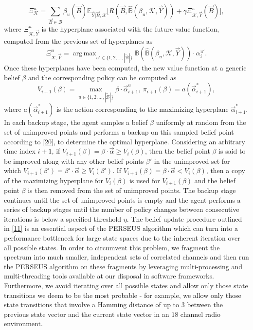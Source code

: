 \documentclass[10pt,twocolumn]{IEEEtran}
\DeclareMathOperator*{\argmax}{arg\,max}
\begin{document}
\begin{equation}
        \Xi_{\mathcal{K}}^{u} = \sum_{\vec{B} {\in} \mathcal{B}} \beta_{u}(\vec{B}) \mathbb{E}_{\vec{Y}|\vec{B}, \mathcal{K}} \Big[R(\vec{B}, \hat{\mathbb{B}}(\beta_{u}, \mathcal{K}, \vec{Y}))+\gamma 
        \Xi_{\mathcal{K}, \vec{Y}}^{u}(\vec{B})\Big],
\nonumber
\end{equation}
where $\Xi_{\mathcal{K}, \vec{Y}}^{u}$ is the hyperplane associated with the future value function, computed from the previous set of hyperplanes as
\begin{equation}
    \Xi_{\mathcal{K}, \vec{Y}}^{u}=\argmax_{u' {\in} \{1, 2, \dots, |\tilde{\mathcal{B}}|\}} \mathbb{B}(\hat{\mathbb{B}}(\beta_{u}, \mathcal{K}, \vec{Y}))\cdot\alpha_{i}^{u'}.
\nonumber
\end{equation}
Once these hyperplanes have been computed, the new value function at a generic belief $\beta$ and the corresponding policy can be computed as
\begin{equation}\label{40}
V_{i+1}(\beta) =\!\!\!\!\!\!\!\!\max_{u {\in} \{1, 2, \dots, |\tilde{\mathcal{B}}|\}}\! \beta \cdot \vec{\alpha}_{i+1}^u,
\ \pi_{i+1}(\beta) = a(\vec{\alpha}_{i+1}^{*}),\!\!
\end{equation}
where $a(\vec{\alpha}_{i+1}^{*})$ is the action corresponding to the maximizing hyperplane $\vec{\alpha}_{i+1}^{*}$. In each backup stage, the agent samples a belief $\beta$ uniformly at random from the set of unimproved points and performs a backup on this sampled belief point according to \eqref{20}, to determine the optimal hyperplane. Considering an arbitrary time index $i{+}1$, if $V_{i+1}(\beta){=}\beta{\cdot}\vec{\alpha}{\geq}V_{i}(\beta)$, then the belief point $\beta$ is said to be improved along with any other belief points $\beta'$ in the unimproved set for which $V_{i+1}(\beta'){=}\beta'{\cdot}\vec{\alpha}{\geq}V_{i}(\beta')$. If $V_{i+1}(\beta){=}\beta{\cdot}\vec{\alpha}{<}V_{i}(\beta)$, then a copy of the maximizing hyperplane for $V_i(\beta)$ is used for $V_{i+1}(\beta)$ and the belief point $\beta$ is then removed from the set of unimproved points. The backup stage continues until the set of unimproved points is empty and the agent performs a series of backup stages until the number of policy changes between consecutive iterations is below a specified threshold $\eta$. The belief update procedure outlined in \eqref{11} is an essential aspect of the PERSEUS algorithm which can turn into a performance bottleneck for large state spaces due to the inherent iteration over all possible states. In order to circumvent this problem, we fragment the spectrum into much smaller, independent sets of correlated channels and then run the PERSEUS algorithm on these fragments by leveraging multi-processing and multi-threading tools available at our disposal in software frameworks. Furthermore, we avoid iterating over all possible states and allow only those state transitions we deem to be the most probable - for example, we allow only those state transitions that involve a Hamming distance of up to $3$ between the previous state vector and the current state vector in an $18$ channel radio environment.
\vspace{-3.5mm}
\end{document}
